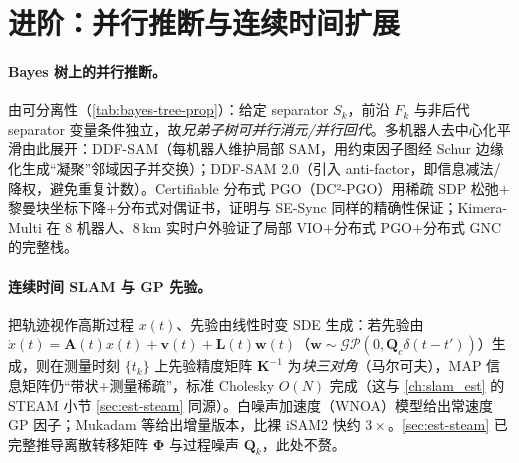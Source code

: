 \section{进阶：并行推断与连续时间扩展}
\label{sec:isam-parallel}

\paragraph{Bayes 树上的并行推断。}
由可分离性（\cref{tab:bayes-tree-prop}）：给定 separator $S_k$，前沿 $F_k$ 与非后代 separator 变量条件独立，故\emph{兄弟子树可并行消元/并行回代}。多机器人去中心化平滑由此展开：DDF-SAM\cite{cunningham2010ddfsam}（每机器人维护局部 SAM，用约束因子图经 Schur 边缘化生成“凝聚”邻域因子并交换）；DDF-SAM 2.0\cite{cunningham2013ddfsam2}（引入 anti-factor，即信息减法/降权，避免重复计数）。Certifiable 分布式 PGO（DC²-PGO\cite{tian2021distributed}）用稀疏 SDP 松弛$+$黎曼块坐标下降$+$分布式对偶证书，证明与 SE-Sync 同样的精确性保证；Kimera-Multi\cite{tian2022kimeramulti} 在 $8$ 机器人、$8$\,km 实时户外验证了局部 VIO$+$分布式 PGO$+$分布式 GNC 的完整栈。

\paragraph{连续时间 SLAM 与 GP 先验。}
把轨迹视作高斯过程 $x(t)$、先验由线性时变 SDE 生成\cite{barfoot2014batch}：若先验由 $\dot x(t)=\mathbf{A}(t)x(t)+\mathbf{v}(t)+\mathbf{L}(t)\mathbf{w}(t)$（$\mathbf{w}\sim\mathcal{GP}(0,\mathbf{Q}_c\delta(t-t'))$）生成，则在测量时刻 $\{t_k\}$ 上先验精度矩阵 $\mathbf{K}^{-1}$ 为\emph{块三对角}（马尔可夫），MAP 信息矩阵仍“带状$+$测量稀疏”，标准 Cholesky $O(N)$ 完成（这与 \cref{ch:slam_est} 的 STEAM 小节 \cref{sec:est-steam} 同源）。白噪声加速度（WNOA）模型给出常速度 GP 因子；Mukadam 等给出增量版本，比裸 iSAM2 快约 $3\times$。\cref{sec:est-steam} 已完整推导离散转移矩阵 $\boldsymbol{\Phi}$ 与过程噪声 $\mathbf{Q}_k$，此处不赘。

